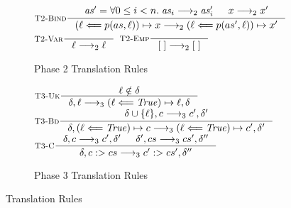 \begin{figure}
\begin{subfigure}[t]{1\textwidth}
\begin{center}
      $\inference
         [\AssignmentWithPredTrans]
         {\mathit{as}' = \forall 0 \leq i < n. \; \mathit{as}_i \translate \mathit{as}'_i & x \translate x'}
         {(\lab \Longleftarrow p(as, \lab)) \mapsto x \translate (\lab \Longleftarrow p(as', \lab)) \mapsto x'}$
      $\inference
         [\Variable]
         {}
         {\lab \translate \lab}$
      $\inference
         [\EmptyTrans]
         {}
         {\nil \translate \nil}$
      \end{center}
      \caption{Phase 2 Translation Rules}
      \label{fig:translation-rules-phase2}
   \end{subfigure}
   \begin{subfigure}[t]{1\textwidth}\footnotesize
   \begin{center}
      $\inference
         [\UnknownLabel]
         {\lab \notin \context}
         {\context, \lab \translateThree (\lab \Longleftarrow \mathit{True}) \mapsto \lab, \context}$
      $\inference
         [\ThrBind]
         {\context \cup \{\lab\}, \core \translateThree \core', \context'}
         {\context, (\lab \Longleftarrow \mathit{True}) \mapsto \core \translateThree (\lab \Longleftarrow \mathit{True}) \mapsto \core', \context'}$
      $\inference
         [\ThrCons]
         {\context, c \translateThree c', \context'
         & \context', cs \translateThree cs', \context''}
         {\context, c \cons cs \translateThree c' \cons cs', \context''}$
   \end{center}
      \caption{Phase 3 Translation Rules}
      \label{fig:translation-rules-phase3}
   \end{subfigure}
 
   \caption{Translation Rules}
   \label{fig:translation-rules}
\end{figure}
